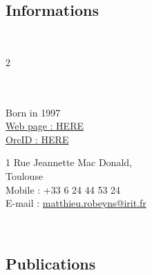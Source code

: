 \subsection{Informations}

\mbox{}\\[-25pt]
\begin{multicols}{2}

    \mbox{}\\[-8pt]
    \\
    \indent Born in 1997\\
    \indent \href{https://disatiler.github.io/Disatilertemp.github.io/}{Web page : HERE} \\
    \indent \href{https://orcid.org/0009-0002-5755-1818}{OrcID : HERE}

    \columnbreak

    1 Rue Jeannette Mac Donald,\\
     Toulouse\\
    \indent Mobile : +33 6 24 44 53 24\\
    \indent E-mail : \href{mailto:matthieu.robeyns@irit.fr}{matthieu.robeyns@irit.fr}\\

\end{multicols}
\mbox{}\\[-55pt]

\subsection{Publications}


